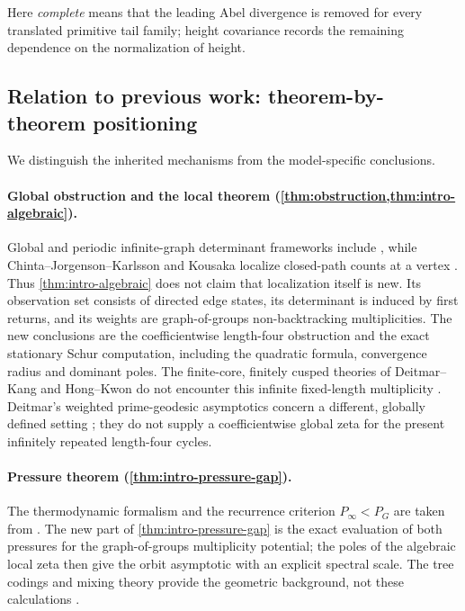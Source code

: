 \documentclass[11pt,reqno]{amsart}
\numberwithin{equation}{section}
\theoremstyle{definition}
\theoremstyle{remark}
\begin{document}
Here \emph{complete} means that the leading Abel divergence is removed for
every translated primitive tail family; height covariance records the
remaining dependence on the normalization of height.

\subsection{Relation to previous work: theorem-by-theorem positioning}

We distinguish the inherited mechanisms from the model-specific conclusions.

\paragraph{Global obstruction and the local theorem
(\cref{thm:obstruction,thm:intro-algebraic}).}
Global and periodic infinite-graph determinant frameworks include
\cite{BowenLanford1970,Bass1992,ClairMokhtariSharghi2001,
GuidoIsolaLapidus2008Periodic,GuidoIsolaLapidus2008Approximation,Deitmar2015},
while Chinta--Jorgenson--Karlsson and Kousaka localize closed-path counts at a
vertex \cite{ChintaJorgensonKarlsson2015,Kousaka2023}.  Thus
\cref{thm:intro-algebraic} does not claim that localization itself is new.  Its
observation set consists of directed edge states, its determinant is induced
by first returns, and its weights are graph-of-groups non-backtracking
multiplicities.  The new conclusions are the coefficientwise length-four
obstruction and the exact stationary Schur computation, including the
quadratic formula, convergence radius and dominant poles.  The finite-core,
finitely cusped theories of Deitmar--Kang and Hong--Kwon do not encounter this
infinite fixed-length multiplicity \cite{DeitmarKang2018,HongKwon2025}.
Deitmar's weighted prime-geodesic asymptotics concern a different, globally
defined setting \cite{Deitmar2023}; they do not supply a coefficientwise
global zeta for the present infinitely repeated length-four cycles.

\paragraph{Pressure theorem (\cref{thm:intro-pressure-gap}).}
The thermodynamic formalism and the recurrence criterion
$P_\infty<P_G$ are taken from
\cite{GurevichSavchenko1998,Sarig1999,Sarig2001,SarigPhase2001,
RuhrSarig2022,Velozo2026}.  The new part of
\cref{thm:intro-pressure-gap} is the exact
evaluation of both pressures for the graph-of-groups multiplicity potential;
the poles of the algebraic local zeta then give the orbit asymptotic with an
explicit spectral scale.  The tree codings and mixing theory provide the
geometric background, not these calculations
\cite{BroisePaulinCoding2007,BroisePaulinModular2007,
BroiseParkkonenPaulin2016,BroiseParkkonenPaulin2019,
BroiseParkkonenPaulin2021}.
\end{document}

